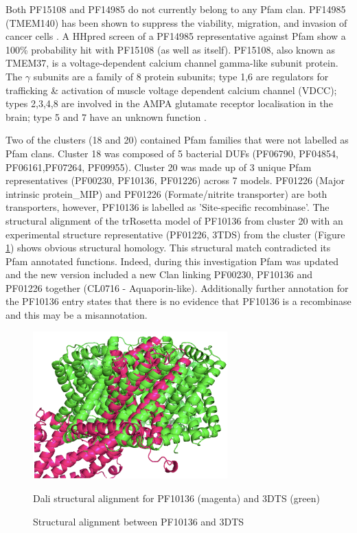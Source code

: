 Both PF15108 and PF14985 do not currently belong to any Pfam clan. PF14985 (TMEM140) has been shown to suppress the viability, migration, and invasion of cancer cells \cite{refaat2018retrospective}.  A HHpred screen of a PF14985 representative against Pfam show a 100\% probability hit with PF15108 (as well as itself).  PF15108, also known as TMEM37, is a voltage-dependent calcium channel gamma-like subunit protein. The $\gamma$ subunits are a family of 8 protein subunits; type 1,6 are regulators for trafficking & activation of muscle voltage dependent calcium channel (VDCC); types 2,3,4,8 are involved in the AMPA glutamate receptor localisation in the brain; type 5 and 7 have an unknown function \cite{chen2007calcium}.

Two of the clusters (18 and 20) contained Pfam families that were not labelled as Pfam clans.  Cluster 18 was composed of 5 bacterial DUFs (PF06790, PF04854, PF06161,PF07264, PF09955).    Cluster 20 was made up of 3 unique Pfam representatives (PF00230, PF10136, PF01226) across 7 models. PF01226 (Major intrinsic protein\_MIP) and PF01226 (Formate/nitrite transporter) are both transporters, however, PF10136 is labelled as 'Site-specific recombinase'. The structural alignment of the trRosetta model of PF10136 from cluster 20 with an experimental structure representative (PF01226, 3TDS) from the cluster (Figure \ref{fig:PF10136}) shows obvious structural homology.  This structural match contradicted   its Pfam annotated functions.  Indeed, during  this investigation Pfam was updated and the new version included a new Clan linking PF00230, PF10136 and PF01226 together (CL0716 - Aquaporin-like).  Additionally further annotation for the PF10136 entry states that there is no evidence that PF10136 is a recombinase and this may be a misannotation.

\begin{figure}[th!]
    \centering
    \includegraphics[width=75mm, scale=0.75]{Pfam/PF10136.png}
    \caption{Structural alignment between PF10136 and 3DTS}
    \label{fig:PF10136}
    \small
    Dali structural alignment for PF10136 (magenta) and 3DTS (green)
\end{figure}

